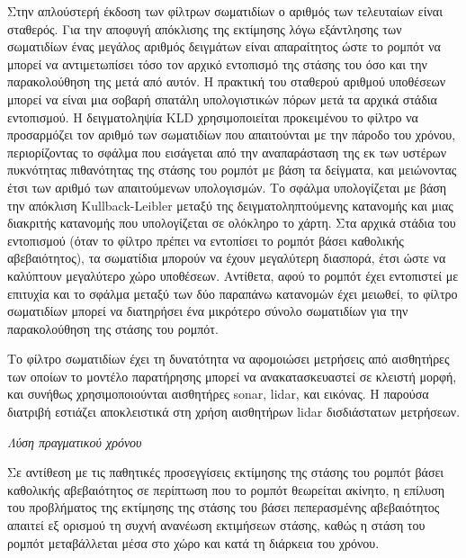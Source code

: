 Στην απλούστερή έκδοση των φίλτρων σωματιδίων ο αριθμός των τελευταίων είναι
σταθερός. Για την αποφυγή απόκλισης της εκτίμησης λόγω εξάντλησης των
σωματιδίων \cite{thrun2005probabilistic} ένας μεγάλος αριθμός δειγμάτων είναι
απαραίτητος ώστε το ρομπότ να μπορεί να αντιμετωπίσει τόσο τον αρχικό εντοπισμό
της στάσης του όσο και την παρακολούθηση της μετά από αυτόν. Η πρακτική του
σταθερού αριθμού υποθέσεων μπορεί να είναι μια σοβαρή σπατάλη υπολογιστικών
πόρων μετά τα αρχικά στάδια εντοπισμού. Η δειγματοληψία KLD \cite{Fox2001}
χρησιμοποιείται προκειμένου το φίλτρο να προσαρμόζει τον αριθμό των σωματιδίων
που απαιτούνται με την πάροδο του χρόνου, περιορίζοντας το σφάλμα που εισάγεται
από την αναπαράσταση της εκ των υστέρων πυκνότητας πιθανότητας της στάσης του
ρομπότ με βάση τα δείγματα, και μειώνοντας έτσι των αριθμό των απαιτούμενων
υπολογισμών. Το σφάλμα υπολογίζεται με βάση την απόκλιση Kullback-Leibler
μεταξύ της δειγματοληπτούμενης κατανομής και μιας διακριτής κατανομής που
υπολογίζεται σε ολόκληρο το χάρτη. Στα αρχικά στάδια του εντοπισμού (όταν το
φίλτρο πρέπει να εντοπίσει το ρομπότ βάσει καθολικής αβεβαιότητος), τα
σωματίδια μπορούν να έχουν μεγαλύτερη διασπορά, έτσι ώστε να καλύπτουν
μεγαλύτερο χώρο υποθέσεων. Αντίθετα, αφού το ρομπότ έχει εντοπιστεί με επιτυχία
και το σφάλμα μεταξύ των δύο παραπάνω κατανομών έχει μειωθεί, το φίλτρο
σωματιδίων μπορεί να διατηρήσει ένα μικρότερο σύνολο σωματιδίων για την
παρακολούθηση της στάσης του ρομπότ.

Το φίλτρο σωματιδίων έχει τη δυνατότητα να αφομοιώσει μετρήσεις από αισθητήρες
των οποίων το μοντέλο παρατήρησης μπορεί να ανακατασκευαστεί σε κλειστή μορφή,
και συνήθως χρησιμοποιούνται αισθητήρες sonar, lidar, και εικόνας. Η παρούσα
διατριβή εστιάζει αποκλειστικά στη χρήση αισθητήρων lidar δισδιάστατων
μετρήσεων.

\begin{gg_box}
\begin{remark}
  \textit{Λύση πραγματικού χρόνου}
  \label{remark:01_01_02_02:03}

  Σε αντίθεση με τις παθητικές προσεγγίσεις εκτίμησης της στάσης του ρομπότ
  βάσει καθολικής αβεβαιότητος σε περίπτωση που το ρομπότ θεωρείται ακίνητο,
  η επίλυση του προβλήματος της εκτίμησης της στάσης του βάσει πεπερασμένης
  αβεβαιότητος απαιτεί εξ ορισμού τη συχνή ανανέωση εκτιμήσεων στάσης, καθώς η
  στάση του ρομπότ μεταβάλλεται μέσα στο χώρο και κατά τη διάρκεια του χρόνου.
\end{remark}
\end{gg_box}


